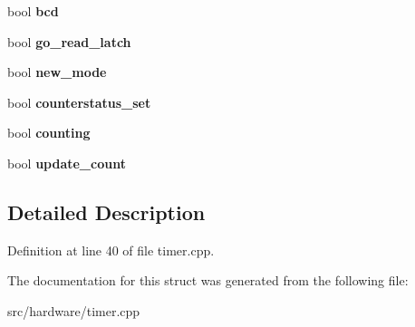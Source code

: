 \begin{DoxyCompactItemize}
\item 
\hypertarget{structPIT__Block_a8ddc522280bb994ea634aa855470836e}{bool {\bfseries bcd}}\label{structPIT__Block_a8ddc522280bb994ea634aa855470836e}

\item 
\hypertarget{structPIT__Block_a7a715f03e1acc563935446865c6ff565}{bool {\bfseries go\-\_\-read\-\_\-latch}}\label{structPIT__Block_a7a715f03e1acc563935446865c6ff565}

\item 
\hypertarget{structPIT__Block_acf24bddaa36c23e46f27c9b7127707a3}{bool {\bfseries new\-\_\-mode}}\label{structPIT__Block_acf24bddaa36c23e46f27c9b7127707a3}

\item 
\hypertarget{structPIT__Block_a048abc116ac6c60acfc407a6274a69ae}{bool {\bfseries counterstatus\-\_\-set}}\label{structPIT__Block_a048abc116ac6c60acfc407a6274a69ae}

\item 
\hypertarget{structPIT__Block_a22b10292f287bf33a2c5b456dce9bddc}{bool {\bfseries counting}}\label{structPIT__Block_a22b10292f287bf33a2c5b456dce9bddc}

\item 
\hypertarget{structPIT__Block_a81813382e0d2d0d1c79cf97713ae68df}{bool {\bfseries update\-\_\-count}}\label{structPIT__Block_a81813382e0d2d0d1c79cf97713ae68df}

\end{DoxyCompactItemize}


\subsection{Detailed Description}


Definition at line 40 of file timer.\-cpp.



The documentation for this struct was generated from the following file\-:\begin{DoxyCompactItemize}
\item 
src/hardware/timer.\-cpp\end{DoxyCompactItemize}
